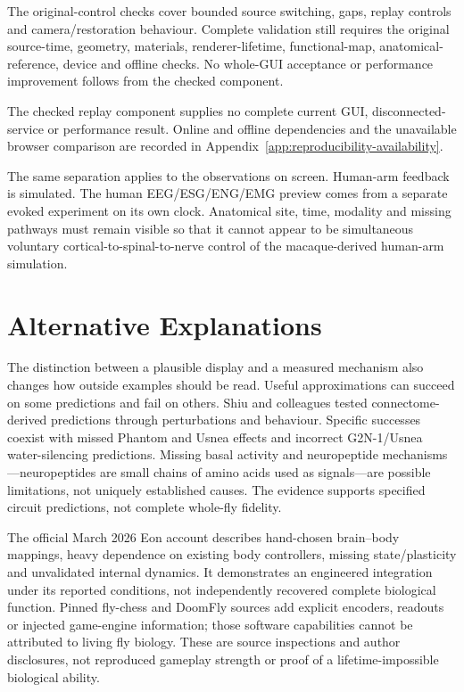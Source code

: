 The original-control checks cover bounded source switching, gaps, replay controls and camera/restoration behaviour. Complete validation still requires the original source-time, geometry, materials, renderer-lifetime, functional-map, anatomical-reference, device and offline checks. No whole-GUI acceptance or performance improvement follows from the checked component.

The checked replay component supplies no complete current GUI, disconnected-service or performance result. Online and offline dependencies and the unavailable browser comparison are recorded in Appendix~\ref{app:reproducibility-availability}.

The same separation applies to the observations on screen. Human-arm feedback is simulated. The human EEG/\allowbreak{}ESG/\allowbreak{}ENG/\allowbreak{}EMG preview comes from a separate evoked experiment on its own clock. Anatomical site, time, modality and missing pathways must remain visible so that it cannot appear to be simultaneous voluntary cortical-to-spinal-to-nerve control of the macaque-derived human-arm simulation.

\section{Alternative Explanations}

The distinction between a plausible display and a measured mechanism also changes how outside examples should be read. Useful approximations can succeed on some predictions and fail on others. Shiu and colleagues tested connectome-derived predictions through perturbations and behaviour. Specific successes coexist with missed Phantom and Usnea effects and incorrect G2N-1/Usnea water-silencing predictions. Missing basal activity and neuropeptide mechanisms---neuropeptides are small chains of amino acids used as signals---are possible limitations, not uniquely established causes. The evidence supports specified circuit predictions, not complete whole-fly fidelity.\citep{shiu2024}

The official March 2026 Eon account describes hand-chosen brain--body mappings,
heavy dependence on existing body controllers, missing state/plasticity and
unvalidated internal dynamics. It demonstrates an engineered integration under
its reported conditions, not independently recovered complete biological
function.\citep{eon2026} Pinned fly-chess and DoomFly sources add explicit
encoders, readouts or injected game-engine information; those software
capabilities cannot be attributed to living fly biology.\citep{flychess,doomfly,doomflyMethodsPinned}
These are source inspections and author disclosures, not reproduced gameplay
strength or proof of a lifetime-impossible biological ability.

